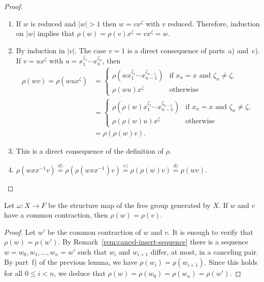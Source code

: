 \begin{proof}
\begin{enumerate}[\rm a)]
        \item If $w$ is reduced and $|w|>1$ then $w=vx^\zeta$ with $v$ reduced. Therefore, induction on $|w|$ implies that $\rho(w)=\rho(v)x^\zeta=vx^\zeta=w$.

        \item By induction in $|v|$. The case $v=1$ is a direct consequence of parts~a) and~c). If $v=ux^\zeta$ with $u=x_1^{\zeta_1}\cdots x_n^{\zeta_n}$, then
        \begin{align*}
            \rho(wv) = \rho(wux^{\zeta}) &= 
                \begin{cases}
                    \rho(wx_1^{\zeta_1}\cdots x_{n-1}^{\zeta_{n-1}})
                        &\text{if $x_n=x$ and $\zeta_n\ne\zeta$},\\
                    \rho(wu)x^{\zeta}
                        &\text{otherwise}
                \end{cases}\\
                &= 
                \begin{cases}
                    \rho(\rho(w)x_1^{\zeta_1}\cdots x_{n-1}^{\zeta_{n-1}})
                        &\text{if $x_n=x$ and $\zeta_n\ne\zeta$},\\
                    \rho(\rho(w)u)x^{\zeta}
                        &\text{otherwise}
                \end{cases}\\
                &= \rho(\rho(w)v).
        \end{align*}

        \item This is a direct consequence of the definition of $\rho$.

        \item $\rho(wxx^{-1}v) \stackrel{d)}{=} \rho(\rho(wxx^{-1})v)
            \stackrel{e)}{=} \rho(\rho(w)v) \stackrel{d)}{=} \rho(wv)$.
    \end{enumerate}
\end{proof}

\begin{prop}
    Let\/ $\omega\colon X\to F$ be the structure map of the free group generated by\/ $X$. If\/ $w$ and\/ $v$ have a common contraction, then\/ $\rho(w)=\rho(v)$.
\end{prop}

\begin{proof}
    Let $w'$ be the common contraction of $w$ and $v$. It is enough to verify that $\rho(w)=\rho(w')$. By Remark~\ref{rem:cancel-insert-sequence} there is a sequence $w=w_0, w_1,\dots,w_n=w'$ such that $w_i$ and $w_{i+1}$ differ, at most, in a canceling pair. By part~f) of the previous lemma, we have $\rho(w_i)=\rho(w_{i+1})$. Since this holds for all $0\le i<n$, we deduce that $\rho(w)=\rho(w_0)=\rho(w_n)=\rho(w')$.
\end{proof}

